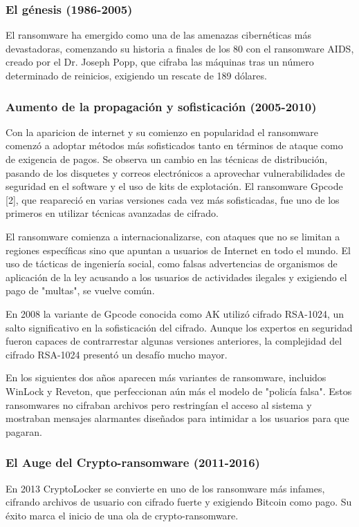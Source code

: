 \subsubsection{El génesis (1986-2005)}
El ransomware ha emergido como una de las amenazas cibernéticas más devastadoras,
comenzando su historia a finales de los 80 con el ransomware AIDS, creado por el Dr. Joseph Popp,  que cifraba las máquinas tras un número determinado de reinicios, exigiendo un rescate de 189 dólares\autocite{bates1990aids}.

\subsubsection{Aumento de la propagación y sofisticación (2005-2010)}
Con la aparicion de internet y su comienzo en popularidad  el ransomware comenzó a adoptar métodos más sofisticados tanto en términos de ataque como de exigencia de pagos. Se observa un cambio en las técnicas de distribución, pasando de los disquetes y correos electrónicos a aprovechar vulnerabilidades de seguridad en el software y el uso de kits de explotación. El ransomware Gpcode [2], que reapareció en varias versiones cada vez más sofisticadas, fue uno de los primeros en utilizar técnicas avanzadas de cifrado.

El ransomware comienza a internacionalizarse, con ataques que no se limitan a regiones específicas sino que apuntan a usuarios de Internet en todo el mundo. El uso de tácticas de ingeniería social, como falsas advertencias de organismos de aplicación de la ley acusando a los usuarios de actividades ilegales y exigiendo el pago de "multas", se vuelve común.

En 2008 la variante de Gpcode conocida como AK utilizó cifrado RSA-1024, un salto significativo en la sofisticación del cifrado. Aunque los expertos en seguridad fueron capaces de contrarrestar algunas versiones anteriores, la complejidad del cifrado RSA-1024 presentó un desafío mucho mayor\autocite{knowbe4gpcode}. 

En los siguientes dos años aparecen más variantes de ransomware, incluidos WinLock y Reveton, que perfeccionan aún más el modelo de "policía falsa". Estos ransomwares no cifraban archivos pero restringían el acceso al sistema y mostraban mensajes alarmantes diseñados para intimidar a los usuarios para que pagaran.




\subsubsection{El Auge del Crypto-ransomware (2011-2016)}
En 2013 CryptoLocker se convierte en uno de los ransomware más infames, cifrando archivos de usuario con cifrado fuerte y exigiendo Bitcoin como pago. Su éxito marca el inicio de una ola de crypto-ransomware\autocite{naraine2013cryptolocker}. 

